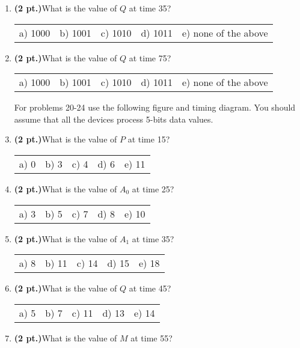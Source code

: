 \documentclass{article}
\begin{document}
\begin{enumerate}
\item {\bf (2 pt.)}What is the value of $Q$ at time 35?

\begin{tabular}{p{0.6in} p{0.6in} p{0.6in} p{0.6in} l}
a) 1000 & b) 1001 & c) 1010 & d) 1011 & e) none of the above
\end{tabular}

\item {\bf (2 pt.)}What is the value of $Q$ at time 75?

\begin{tabular}{p{0.6in} p{0.6in} p{0.6in} p{0.6in} l}
a) 1000 & b) 1001 & c) 1010 & d) 1011 & e) none of the above
\end{tabular}


\pagebreak
For problems 20-24 use the following figure and timing diagram.
You should assume that all the devices process 5-bits data 
values.


\item {\bf (2 pt.)}What is the value of $P$ at time 15?

\begin{tabular}{p{0.6in} p{0.6in} p{0.6in} p{0.6in} l}
a) 0  & b) 3  & c) 4  & d) 6  & e)  11
\end{tabular}

\item {\bf (2 pt.)}What is the value of $A_0$ at time 25?

\begin{tabular}{p{0.6in} p{0.6in} p{0.6in} p{0.6in} l}
a) 3  & b) 5  & c) 7  & d) 8 & e) 10
\end{tabular}

\item {\bf (2 pt.)}What is the value of $A_1$ at time 35?

\begin{tabular}{p{0.6in} p{0.6in} p{0.6in} p{0.6in} l}
a) 8  & b) 11  & c) 14 & d) 15  & e) 18
\end{tabular}

\item {\bf (2 pt.)}What is the value of $Q$ at time 45?

\begin{tabular}{p{0.6in} p{0.6in} p{0.6in} p{0.6in} l}
a) 5  & b) 7  & c) 11 & d) 13  & e) 14
\end{tabular}

\item {\bf (2 pt.)}What is the value of $M$ at time 55?


\end{enumerate}
\end{document}
